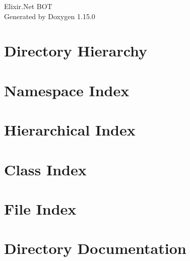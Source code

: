 \documentclass[twoside]{book}
\newcommand{\+}{\discretionary{\mbox{\scriptsize$\hookleftarrow$}}{}{}}
\newcommand{\clearemptydoublepage}{%
    \newpage{\pagestyle{empty}\cleardoublepage}%
  }
\begin{document}
  \raggedbottom
    \hypersetup{pageanchor=false,
                bookmarksnumbered=true,
                pdfencoding=unicode
               }
  \begin{titlepage}
  \vspace*{7cm}
  \begin{center}%
  {\Large Elixir.\+Net BOT}\\
  \vspace*{1cm}
  {\large Generated by Doxygen 1.15.0}\\
  \end{center}
  \end{titlepage}
  \clearemptydoublepage
  \tableofcontents
  \clearemptydoublepage
  \hypersetup{pageanchor=true}

\chapter{Directory Hierarchy}

\chapter{Namespace Index}

\chapter{Hierarchical Index}

\chapter{Class Index}

\chapter{File Index}

\chapter{Directory Documentation}






















\end{document}
